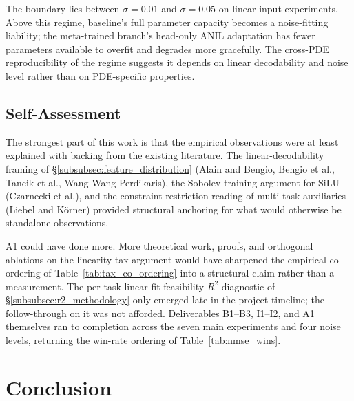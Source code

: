 \documentclass[10pt,journal,compsoc]{IEEEtran}
\begin{document}
The boundary lies between $\sigma{=}0.01$ and $\sigma{=}0.05$ on
linear-input experiments. Above this regime, baseline's full
parameter capacity becomes a noise-fitting liability; the
meta-trained branch's head-only ANIL adaptation has fewer parameters
available to overfit and degrades more gracefully. The cross-PDE
reproducibility of the regime suggests it depends on
linear decodability and noise level rather than on
PDE-specific properties.

\subsection{Self-Assessment}\label{subsec:eval_self_assess}

The strongest part of this work is that the empirical observations were
at least explained with backing from the existing literature. The
linear-decodability framing of \S\ref{subsubsec:feature_distribution}
(Alain and Bengio, Bengio et al., Tancik et al.,
Wang-Wang-Perdikaris), the Sobolev-training argument for SiLU
(Czarnecki et al.), and the constraint-restriction reading of multi-task
auxiliaries (Liebel and K\"orner) provided structural anchoring for what
would otherwise be standalone observations.

A1 could have done more. More theoretical work, proofs, and orthogonal
ablations on the linearity-tax argument would have sharpened the
empirical co-ordering of Table~\ref{tab:tax_co_ordering} into a
structural claim rather than a measurement. The per-task linear-fit
feasibility $R^2$ diagnostic of \S\ref{subsubsec:r2_methodology} only
emerged late in the project timeline; the follow-through on it was not
afforded. Deliverables B1--B3, I1--I2, and A1 themselves ran to
completion across the seven main experiments and four noise levels,
returning the win-rate ordering of Table~\ref{tab:nmse_wins}.

\section{Conclusion}\label{sec:conclusion}
\end{document}

